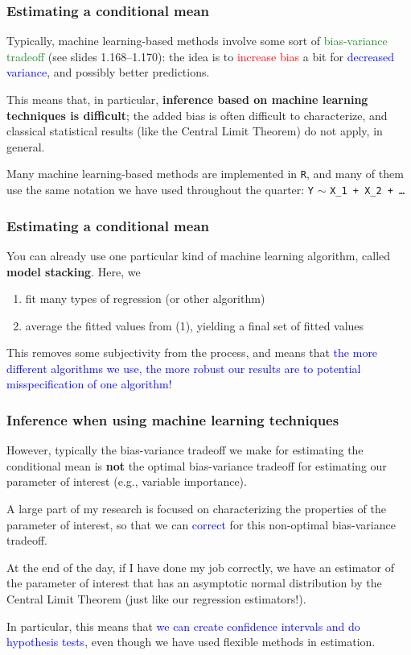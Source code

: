 \documentclass[12pt, 
hyperref={colorlinks=true, linkcolor=blue, urlcolor=cyan},dvipsnames]{beamer}
\begin{document}
\begin{frame}
\frametitle{Estimating a conditional mean}
Typically, machine learning-based methods involve some sort of \textcolor{ForestGreen}{bias-variance tradeoff} (see slides 1.168--1.170): the idea is to \textcolor{red}{increase bias} a bit for \textcolor{blue}{decreased variance}, and possibly better predictions. 

This means that, in particular, \textbf{inference based on machine learning techniques is difficult}; the added bias is often difficult to characterize, and classical statistical results (like the Central Limit Theorem) do not apply, in general.

Many machine learning-based methods are implemented in \texttt{R}, and many of them use the same notation we have used throughout the quarter: \texttt{Y} $\sim$ \texttt{X\_1 + X\_2 + \dots}

\end{frame}

\begin{frame}
\frametitle{Estimating a conditional mean}
You can already use one particular kind of machine learning algorithm, called \textbf{model stacking}. Here, we 
\begin{enumerate}
\item fit many types of regression (or other algorithm)
\item average the fitted values from (1), yielding a final set of fitted values
\end{enumerate}
This removes some subjectivity from the process, and means that \textcolor{blue}{the more different algorithms we use, the more robust our results are to potential misspecification of one algorithm!}
\end{frame}

\begin{frame}
\frametitle{Inference when using machine learning techniques}

However, typically the bias-variance tradeoff we make for estimating the conditional mean is \textbf{not} the optimal bias-variance tradeoff for estimating our parameter of interest (e.g., variable importance).

A large part of my research is focused on characterizing the properties of the parameter of interest, so that we can \textcolor{blue}{correct} for this non-optimal bias-variance tradeoff.

At the end of the day, if I have done my job correctly, we have an estimator of the parameter of interest that has an asymptotic normal distribution by the Central Limit Theorem (just like our regression estimators!).

In particular, this means that \textcolor{blue}{we can create confidence intervals and do hypothesis tests}, even though we have used flexible methods in estimation.
\end{frame}
\end{document}
